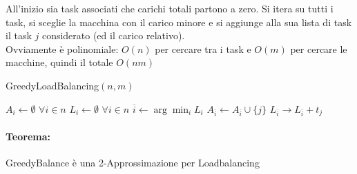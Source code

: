 \documentclass[11pt]{article}
\begin{document}
	All'inizio sia task associati che carichi totali partono a zero. Si itera su tutti i task, si sceglie la macchina con il carico minore e si aggiunge alla sua lista di task il task $j$ considerato (ed il carico relativo).\\
	Ovviamente è polinomiale: $O(n)$ per cercare tra i task e $O(m)$ per cercare le macchine, quindi il totale $O(nm)$
	
	\begin{algorithm}
		\caption{GreedyLoadBalancing$(n, m)$}
		\begin{algorithmic}
			\STATE $A_i \leftarrow \emptyset$ $\forall i \in n$
			\STATE $L_i \leftarrow \emptyset$ $\forall i \in n$
				\STATE $\overline{i} \leftarrow \arg \min_i L_i$
				\STATE $A_{\overline{i}} \leftarrow A_{\overline{i}} \cup \{j\}$
				\STATE $L_{\overline{i}} \rightarrow L_{\overline{i}} + t_j$
			\ENDFOR
		\end{algorithmic}
	\end{algorithm}

	\paragraph{Teorema:} GreedyBalance è una 2-Approssimazione per Loadbalancing
	
\end{document}
